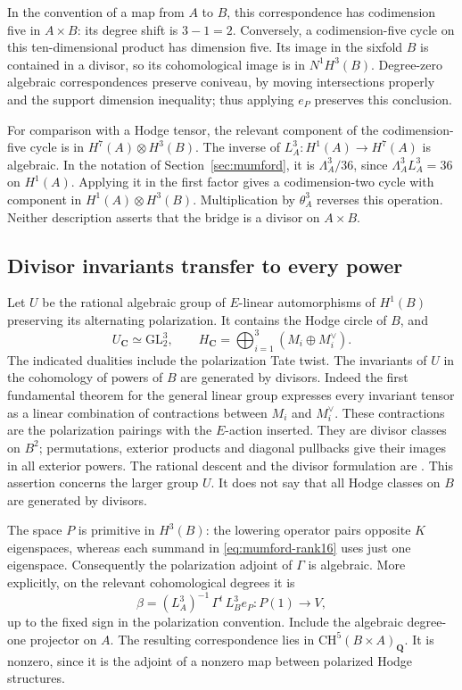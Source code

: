 \documentclass[11pt]{article}
\theoremstyle{definition}
\theoremstyle{remark}
\begin{document}
In the convention of a map from $A$ to $B$, this correspondence has
codimension five in $A\times B$: its degree shift is $3-1=2$.
Conversely, a codimension-five cycle on this ten-dimensional product
has dimension five.  Its image in the sixfold $B$ is contained in a
divisor, so its cohomological image is in $N^1H^3(B)$.
Degree-zero algebraic correspondences preserve coniveau, by moving
intersections properly and the support dimension inequality; thus
applying $e_P$ preserves this conclusion.

For comparison with a Hodge tensor, the relevant component of the
codimension-five cycle is in $H^7(A)\otimes H^3(B)$.
The inverse of $L_A^3:H^1(A)\to H^7(A)$ is algebraic.  In the notation
of Section~\ref{sec:mumford}, it is $\Lambda_A^3/36$, since
$\Lambda_A^3L_A^3=36$ on $H^1(A)$.
Applying it in the first factor gives a codimension-two cycle with
component in $H^1(A)\otimes H^3(B)$.  Multiplication by $\theta_A^3$
reverses this operation.  Neither description asserts that the bridge
is a divisor on $A\times B$.

\subsection{Divisor invariants transfer to every power}

Let $U$ be the rational algebraic group of $E$-linear automorphisms of
$H^1(B)$ preserving its alternating polarization.  It contains the
Hodge circle of $B$, and
\[
 U_{\mathbf C}\simeq\mathrm{GL}_2^3,
 \qquad H_{\mathbf C}=\bigoplus_{i=1}^3(M_i\oplus M_i^\vee).
\]
The indicated dualities include the polarization Tate twist.
The invariants of $U$ in the cohomology of powers of $B$ are generated
by divisors.  Indeed the first fundamental theorem for the general
linear group expresses every invariant tensor as a linear combination
of contractions between $M_i$ and $M_i^\vee$.  These contractions are
the polarization pairings with the $E$-action inserted.  They are
divisor classes on $B^2$; permutations, exterior products and diagonal
pullbacks give their images in all exterior powers.  The rational
descent and the divisor formulation are
\cite[Proposition~3.6(c) and Remark~3.7, pp.~17--18]{MilneLefschetz}.
This assertion concerns the larger group $U$.  It does not say that
all Hodge classes on $B$ are generated by divisors.

The space $P$ is primitive in $H^3(B)$: the lowering operator pairs
opposite $K$ eigenspaces, whereas each summand in
\eqref{eq:mumford-rank16} uses just one eigenspace.
Consequently the polarization adjoint of $\Gamma$ is algebraic.
More explicitly, on the relevant cohomological degrees it is
\[
 \beta=(L_A^3)^{-1}\,\Gamma^t\,L_B^3 e_P:P(1)\longrightarrow V,
\]
up to the fixed sign in the polarization convention.  Include the
algebraic degree-one projector on $A$.  The resulting correspondence
lies in $\mathrm{CH}^5(B\times A)_{\mathbf Q}$.
It is nonzero, since it is the adjoint of a nonzero map between
polarized Hodge structures.
\end{document}
